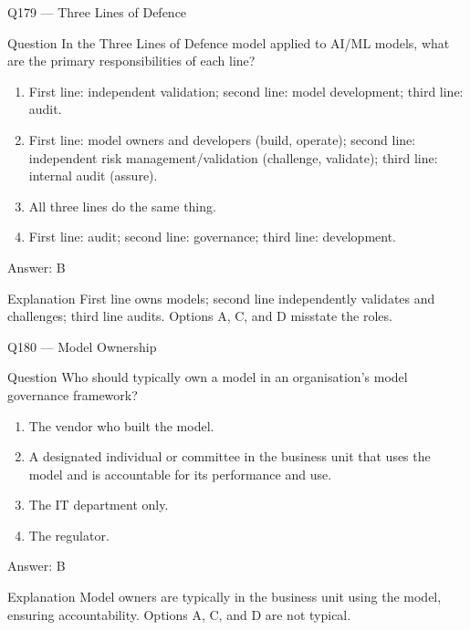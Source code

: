 \documentclass[aspectratio=169,8pt]{beamer}
\begin{document}
\begin{frame}{Q179 --- Three Lines of Defence}
\begin{block}{Question}
In the Three Lines of Defence model applied to AI/ML models, what are the primary responsibilities of each line?
\begin{enumerate}
\item First line: independent validation; second line: model development; third line: audit.
\item First line: model owners and developers (build, operate); second line: independent risk management/validation (challenge, validate); third line: internal audit (assure).
\item All three lines do the same thing.
\item First line: audit; second line: governance; third line: development.
\end{enumerate}  \end{block}
\begin{exampleblock}{Answer: B}\end{exampleblock}
\begin{block}{Explanation}
First line owns models; second line independently validates and challenges; third line audits. Options A, C, and D misstate the roles.
\end{block}
\end{frame}

\begin{frame}{Q180 --- Model Ownership}
\begin{block}{Question}
Who should typically own a model in an organisation's model governance framework?
\begin{enumerate}
\item The vendor who built the model.
\item A designated individual or committee in the business unit that uses the model and is accountable for its performance and use.
\item The IT department only.
\item The regulator.
\end{enumerate}  \end{block}
\begin{exampleblock}{Answer: B}\end{exampleblock}
\begin{block}{Explanation}
Model owners are typically in the business unit using the model, ensuring accountability. Options A, C, and D are not typical.
\end{block}
\end{frame}
\end{document}
